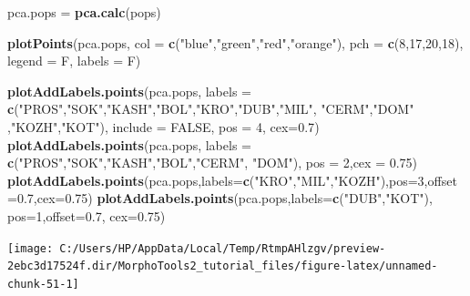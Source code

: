 \documentclass[
]{article}
\newenvironment{Shaded}{\begin{snugshade}}{\end{snugshade}}
\newcommand{\DataTypeTok}[1]{\textcolor[rgb]{0.13,0.29,0.53}{#1}}
\newcommand{\DecValTok}[1]{\textcolor[rgb]{0.00,0.00,0.81}{#1}}
\newcommand{\FloatTok}[1]{\textcolor[rgb]{0.00,0.00,0.81}{#1}}
\newcommand{\KeywordTok}[1]{\textcolor[rgb]{0.13,0.29,0.53}{\textbf{#1}}}
\newcommand{\NormalTok}[1]{#1}
\newcommand{\OtherTok}[1]{\textcolor[rgb]{0.56,0.35,0.01}{#1}}
\newcommand{\StringTok}[1]{\textcolor[rgb]{0.31,0.60,0.02}{#1}}
\begin{document}
\begin{Shaded}
\begin{Highlighting}[]
\NormalTok{pca.pops =}\StringTok{ }\KeywordTok{pca.calc}\NormalTok{(pops)}

\KeywordTok{plotPoints}\NormalTok{(pca.pops, }\DataTypeTok{col =} \KeywordTok{c}\NormalTok{(}\StringTok{"blue"}\NormalTok{,}\StringTok{"green"}\NormalTok{,}\StringTok{"red"}\NormalTok{,}\StringTok{"orange"}\NormalTok{), }\DataTypeTok{pch =} \KeywordTok{c}\NormalTok{(}\DecValTok{8}\NormalTok{,}\DecValTok{17}\NormalTok{,}\DecValTok{20}\NormalTok{,}\DecValTok{18}\NormalTok{), }
            \DataTypeTok{legend =}\NormalTok{ F, }\DataTypeTok{labels =}\NormalTok{ F)}

\KeywordTok{plotAddLabels.points}\NormalTok{(pca.pops, }\DataTypeTok{labels =} \KeywordTok{c}\NormalTok{(}\StringTok{"PROS"}\NormalTok{,}\StringTok{"SOK"}\NormalTok{,}\StringTok{"KASH"}\NormalTok{,}\StringTok{"BOL"}\NormalTok{,}\StringTok{"KRO"}\NormalTok{,}\StringTok{"DUB"}\NormalTok{,}\StringTok{"MIL"}\NormalTok{,}
                      \StringTok{"CERM"}\NormalTok{,}\StringTok{"DOM"}\NormalTok{ ,}\StringTok{"KOZH"}\NormalTok{,}\StringTok{"KOT"}\NormalTok{), }\DataTypeTok{include =} \OtherTok{FALSE}\NormalTok{, }\DataTypeTok{pos =} \DecValTok{4}\NormalTok{, }\DataTypeTok{cex=}\FloatTok{0.7}\NormalTok{)}
\KeywordTok{plotAddLabels.points}\NormalTok{(pca.pops, }\DataTypeTok{labels =} \KeywordTok{c}\NormalTok{(}\StringTok{"PROS"}\NormalTok{,}\StringTok{"SOK"}\NormalTok{,}\StringTok{"KASH"}\NormalTok{,}\StringTok{"BOL"}\NormalTok{,}\StringTok{"CERM"}\NormalTok{, }\StringTok{"DOM"}\NormalTok{), }
                      \DataTypeTok{pos =} \DecValTok{2}\NormalTok{,}\DataTypeTok{cex =} \FloatTok{0.75}\NormalTok{)}
\KeywordTok{plotAddLabels.points}\NormalTok{(pca.pops,}\DataTypeTok{labels=}\KeywordTok{c}\NormalTok{(}\StringTok{"KRO"}\NormalTok{,}\StringTok{"MIL"}\NormalTok{,}\StringTok{"KOZH"}\NormalTok{),}\DataTypeTok{pos=}\DecValTok{3}\NormalTok{,}\DataTypeTok{offset=}\FloatTok{0.7}\NormalTok{,}\DataTypeTok{cex=}\FloatTok{0.75}\NormalTok{)}
\KeywordTok{plotAddLabels.points}\NormalTok{(pca.pops,}\DataTypeTok{labels=}\KeywordTok{c}\NormalTok{(}\StringTok{"DUB"}\NormalTok{,}\StringTok{"KOT"}\NormalTok{), }\DataTypeTok{pos=}\DecValTok{1}\NormalTok{,}\DataTypeTok{offset=}\FloatTok{0.7}\NormalTok{, }\DataTypeTok{cex=}\FloatTok{0.75}\NormalTok{)}
\end{Highlighting}
\end{Shaded}

\begin{center}\texttt{[image: C:/Users/HP/AppData/Local/Temp/RtmpAHlzgv/preview-2ebc3d17524f.dir/MorphoTools2\_tutorial\_files/figure-latex/unnamed-chunk-51-1]} \end{center}
\end{document}
